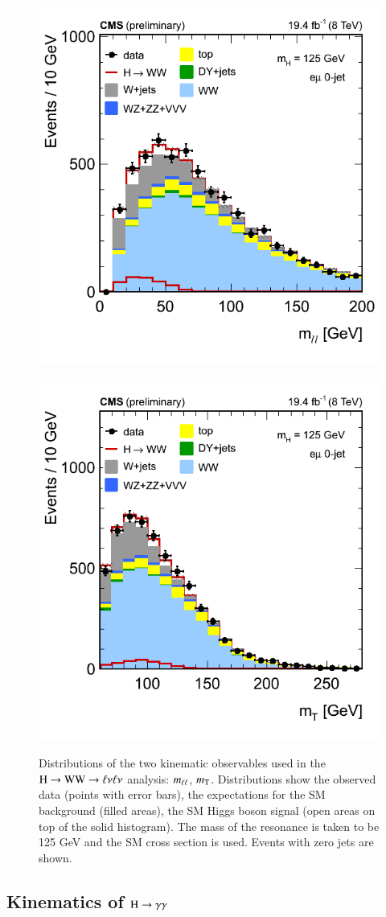 \begin{figure}[!p]
\begin{center}
\centerline{
\includegraphics[width=0.50\linewidth]{figures/wwpresel_0j_mh125_massll.png}
~~~~~
\includegraphics[width=0.50\linewidth]{figures/wwpresel_0j_mh125_mt.png}
}
\caption{ 
  Distributions of the two kinematic observables
  used in the $\mathrm{H}\to\mathrm{W}\mathrm{W}\to\ell\nu\ell\nu$ analysis: $m_{\ell\ell}$, $m_{\mathrm{T}}$.  Distributions
  show the observed data (points with error bars), the expectations
  for the SM background (filled areas), the SM Higgs boson signal
  (open areas on top of the solid histogram).  The
  mass of the resonance is taken to be 125 GeV and the SM cross
  section is used.  Events with zero jets are shown.  
\label{fig:hwwkinematics} }
\end{center}
\end{figure}


\subsection{Kinematics of $\mathrm{H}\to\gamma\gamma$}
\label{sec:hggkinematics}

